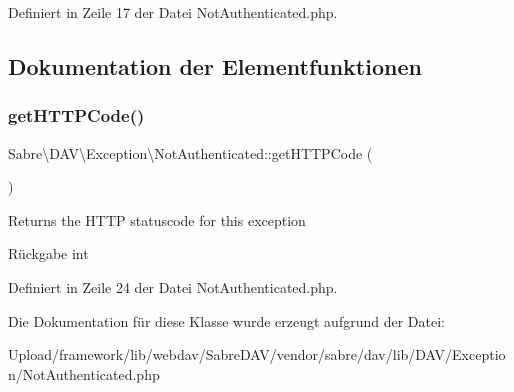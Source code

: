 Definiert in Zeile 17 der Datei Not\+Authenticated.\+php.



\subsection{Dokumentation der Elementfunktionen}
\mbox{\label{class_sabre_1_1_d_a_v_1_1_exception_1_1_not_authenticated_ac9f540017c2117058dc9baaa5e611340}} 
\subsubsection{\texorpdfstring{get\+H\+T\+T\+P\+Code()}{getHTTPCode()}}
{\footnotesize\ttfamily Sabre\textbackslash{}\+D\+A\+V\textbackslash{}\+Exception\textbackslash{}\+Not\+Authenticated\+::get\+H\+T\+T\+P\+Code (\begin{DoxyParamCaption}{ }\end{DoxyParamCaption})}

Returns the H\+T\+TP statuscode for this exception

\begin{DoxyReturn}{Rückgabe}
int 
\end{DoxyReturn}


Definiert in Zeile 24 der Datei Not\+Authenticated.\+php.



Die Dokumentation für diese Klasse wurde erzeugt aufgrund der Datei\+:\begin{DoxyCompactItemize}
\item 
Upload/framework/lib/webdav/\+Sabre\+D\+A\+V/vendor/sabre/dav/lib/\+D\+A\+V/\+Exception/Not\+Authenticated.\+php\end{DoxyCompactItemize}
